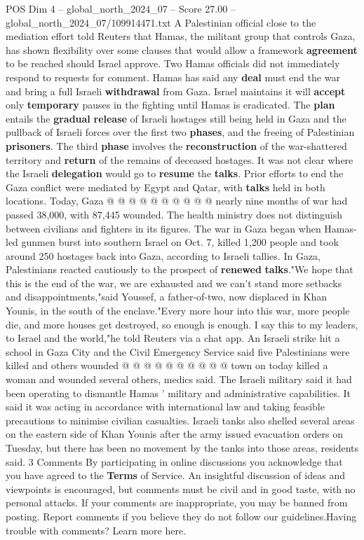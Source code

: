 \begin{textsample}{POS Dim 4 – global\_north\_2024\_07 – Score 27.00 – global\_north\_2024\_07/109914471.txt}
A Palestinian official close to the mediation effort told Reuters that Hamas, the militant group that controls Gaza, has shown flexibility over some clauses that would allow a framework \textbf{agreement} to be reached should Israel approve.
Two Hamas officials did not immediately respond to requests for comment.
Hamas has said any \textbf{deal} must end the war and bring a full Israeli \textbf{withdrawal} from Gaza.
Israel maintains it will \textbf{accept} only \textbf{temporary} pauses in the fighting until Hamas is eradicated.
The \textbf{plan} entails the \textbf{gradual} \textbf{release} of Israeli hostages still being held in Gaza and the pullback of Israeli forces over the first two \textbf{phases}, and the freeing of Palestinian \textbf{prisoners}.
The third \textbf{phase} involves the \textbf{reconstruction} of the war-shattered territory and \textbf{return} of the remains of deceased hostages.
It was not clear where the Israeli \textbf{delegation} would go to \textbf{resume} the \textbf{talks}.
Prior efforts to end the Gaza conflict were mediated by Egypt and Qatar, with \textbf{talks} held in both locations.
Today, Gaza @ @ @ @ @ @ @ @ @ @ nearly nine months of war had passed 38,000, with 87,445 wounded.
The health ministry does not distinguish between civilians and fighters in its figures.
The war in Gaza began when Hamas-led gunmen burst into southern Israel on Oct. 7, killed 1,200 people and took around 250 hostages back into Gaza, according to Israeli tallies.
In Gaza, Palestinians reacted cautiously to the prospect of \textbf{renewed} \textbf{talks}."We hope that this is the end of the war, we are exhausted and we can't stand more setbacks and disappointments,"said Youssef, a father-of-two, now displaced in Khan Younis, in the south of the enclave."Every more hour into this war, more people die, and more houses get destroyed, so enough is enough.
I say this to my leaders, to Israel and the world,"he told Reuters via a chat app.
An Israeli strike hit a school in Gaza City and the Civil Emergency Service said five Palestinians were killed and others wounded @ @ @ @ @ @ @ @ @ @ town on today killed a woman and wounded several others, medics said.
The Israeli military said it had been operating to dismantle Hamas ' military and administrative capabilities.
It said it was acting in accordance with international law and taking feasible precautions to minimise civilian casualties.
Israeli tanks also shelled several areas on the eastern side of Khan Younis after the army issued evacuation orders on Tuesday, but there has been no movement by the tanks into those areas, residents said. 3 Comments By participating in online discussions you acknowledge that you have agreed to the \textbf{Terms} of Service.
An insightful discussion of ideas and viewpoints is encouraged, but comments must be civil and in good taste, with no personal attacks.
If your comments are inappropriate, you may be banned from posting.
Report comments if you believe they do not follow our guidelines.Having trouble with comments?
Learn more here.


\end{textsample}
